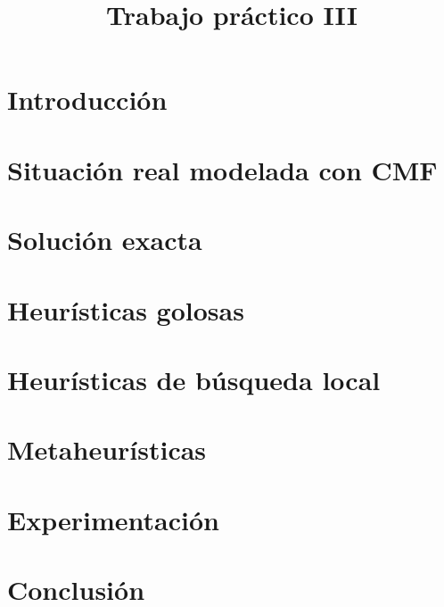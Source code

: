 \documentclass[a4paper,10pt, spanish]{article}
\author{}
\date{}
\title{Trabajo pr\'actico III}
\begin{document}
\maketitle

\tableofcontents
\newpage

\section{Introducción}

\newpage

\section{Situación real modelada con CMF}

\newpage

\section{Solución exacta}

\newpage

\section{Heurísticas golosas}

\newpage

\section{Heurísticas de búsqueda local}

\newpage

\section{Metaheurísticas}

\newpage

\section{Experimentación}

\newpage

\section{Conclusión}

\end{document}
